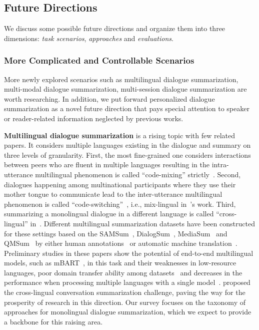 \subsection{Future Directions}
\label{sec:future}


We discuss some possible future directions and organize them into
three dimensions: \textit{task scenarios}, \textit{approaches} and \textit{evaluations}. 


\subsubsection{More Complicated and Controllable Scenarios}

More newly explored scenarios such as multilingual dialogue summarization, multi-modal dialogue summarization, multi-session dialogue summarization are worth researching. In addition, we put forward {personalized dialogue summarization} as a novel future direction that pays special attention to speaker or reader-related information neglected by previous works.

\textbf{Multilingual dialogue summarization} is a rising topic with few related papers. It considers multiple languages existing in the dialogue and summary on three levels of granularity. First, the most fine-grained one considers interactions between peers who are fluent in multiple languages resulting in the intra-utterance multilingual phenomenon is called ``code-mixing'' strictly~\cite{mehnaz2021gupshup}. Second, dialogues happening among multinational participants where they use their mother tongue to communicate lead to the inter-utterance multilingual phenomenon is called ``code-switching''~\cite{mehnaz2021gupshup}, i.e., mix-lingual in~\cite{feng2022msamsum}'s work. Third, summarizing a monolingual dialogue in a different language is called ``cross-lingual'' in~\citet{wang2022clidsum}. Different multilingual summarization datasets have been constructed for these settings based on the SAMSum~\cite{gliwa2019samsum}, DialogSum~\cite{chen2021dialsumm}, MediaSum~\cite{zhu2021mediasum} and QMSum~\cite{zhong2021qmsum} by either human annotations~\cite{wang2022clidsum,mehnaz2021gupshup,chen2022cross} or automatic machine translation~\cite{feng2022msamsum}. Preliminary studies in these papers show the potential of end-to-end multilingual models, such as mBART~\cite{tang2021multilingual},  in this task and their weaknesses in low-resource languages, poor domain transfer ability among datasets~\cite{wang2022clidsum} and decreases in the performance when processing multiple languages with a single model~\cite{feng2022msamsum}. \citet{chen2022cross} proposed the cross-lingual conversation summarization challenge, paving the way for the prosperity of research in this direction. Our survey focuses on the taxonomy of approaches for monolingual dialogue summarization, which we expect to provide a backbone for this raising area.

